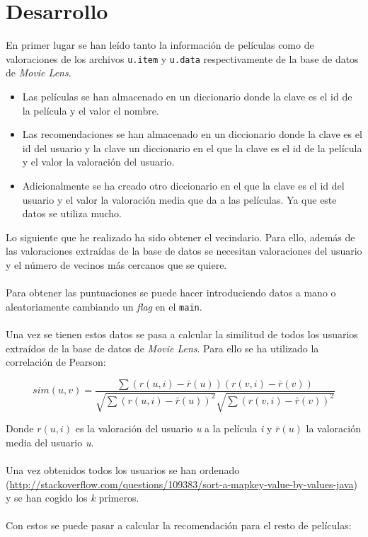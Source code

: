 \section{Desarrollo}
\label{sec:desarrollo}

En primer lugar se han leído tanto la información de películas como de valoraciones de los archivos \texttt{u.item} y \texttt{u.data} respectivamente de la base de datos de \textit{Movie Lens}. 

\begin{itemize}
	\item Las películas se han almacenado en un diccionario donde la clave es el id de la película y el valor el nombre.
	\item Las recomendaciones se han almacenado en un diccionario donde la clave es el id del usuario y la clave un diccionario en el que la clave es el id de la película y el valor la valoración del usuario.
	\item Adicionalmente se ha creado otro diccionario en el que la clave es el id del usuario y el valor la valoración media que da a las películas. Ya que este datos se utiliza mucho.
\end{itemize}

Lo siguiente que he realizado ha sido obtener el vecindario. Para ello, además de las valoraciones extraídas de la base de datos se necesitan valoraciones del usuario y el número de vecinos más cercanos que se quiere.
\\ \\
Para obtener las puntuaciones se puede hacer introduciendo datos a mano o aleatoriamente cambiando un \textit{flag} en el \texttt{main}.
\\ \\
Una vez se tienen estos datos se pasa a calcular la similitud de todos los usuarios extraídos de la base de datos de \textit{Movie Lens}. Para ello se ha utilizado la correlación de Pearson:

\[ sim(u,v) = \frac{\sum(r(u,i)-\bar{r}(u))(r(v,i)-\bar{r}(v))}{\sqrt{\sum(r(u,i)-\bar{r}(u))^2}\sqrt{\sum(r(v,i)-\bar{r}(v))^2}} \]

Donde $ r(u,i) $ es la valoración del usuario \textit{u} a la película \textit{i} y $ \bar{r}(u) $ la valoración media del usuario \textit{u}.
\\ \\
Una vez obtenidos todos los usuarios se han ordenado (\url{http://stackoverflow.com/questions/109383/sort-a-mapkey-value-by-values-java}) y se han cogido los \textit{k} primeros.
\\ \\
Con estos se puede pasar a calcular la recomendación para el resto de películas:

